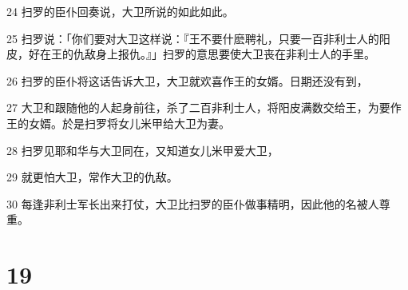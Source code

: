 \par 24 扫罗的臣仆回奏说，大卫所说的如此如此。
\par 25 扫罗说：「你们要对大卫这样说：『王不要什麽聘礼，只要一百非利士人的阳皮，好在王的仇敌身上报仇。』」扫罗的意思要使大卫丧在非利士人的手里。
\par 26 扫罗的臣仆将这话告诉大卫，大卫就欢喜作王的女婿。日期还没有到，
\par 27 大卫和跟随他的人起身前往，杀了二百非利士人，将阳皮满数交给王，为要作王的女婿。於是扫罗将女儿米甲给大卫为妻。
\par 28 扫罗见耶和华与大卫同在，又知道女儿米甲爱大卫，
\par 29 就更怕大卫，常作大卫的仇敌。
\par 30 每逢非利士军长出来打仗，大卫比扫罗的臣仆做事精明，因此他的名被人尊重。

\chapter{19}

